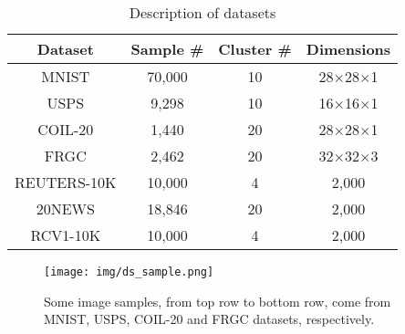 \begin{table}[htbp]
	\caption{Description of datasets}
	\begin{center}
		\begin{tabular}{|c|c|c|c|}
			\hline
			Dataset                        & Sample \# & Cluster \# & Dimensions \\ \hline
			MNIST                          & 70,000      & 10      & 28$\times$28$\times$1    \\ \hline
			USPS                             & 9,298        & 10      & 16$\times$16$\times$1    \\ \hline
			COIL-20                       & 1,440         & 20      & 28$\times$28$\times$1    \\ \hline
			FRGC                             & 2,462        & 20      & 32$\times$32$\times$3    \\ \hline
			REUTERS-10K              &10,000       &4         &2,000 \\ \hline    
			20NEWS                       &18,846       &20         &2,000 \\ \hline 
			RCV1-10K                      &10,000       &4         &2,000 \\ \hline 
		\end{tabular}
		\label{tab1_ds}
	\end{center}
\end{table}
\begin{figure}[htbp]
	\centerline{\texttt{[image: img/ds\_sample.png]}}
	\caption{Some image samples, from top row to bottom row, come from MNIST, USPS, COIL-20 and FRGC datasets, respectively.}
	\label{fig_samples}
\end{figure}

